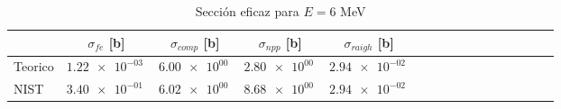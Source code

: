 \begin{table}
\caption{Sección eficaz para $E=6$ MeV}
\begin{tabular}{lccccccccccccccc}
\toprule
 & $\sigma_{fe}$ [b] & $\sigma_{comp}$ [b] & $\sigma_{npp}$ [b] & $\sigma_{raigh}$ [b] \\
\midrule
Teorico & $\SI{1.22e-03}{}$ & $\SI{6.00e+00}{}$ & $\SI{2.80e+00}{}$ & $\SI{2.94e-02}{}$ \\
NIST & $\SI{3.40e-01}{}$ & $\SI{6.02e+00}{}$ & $\SI{8.68e+00}{}$ & $\SI{2.94e-02}{}$ \\
\bottomrule
\end{tabular}
\end{table}
